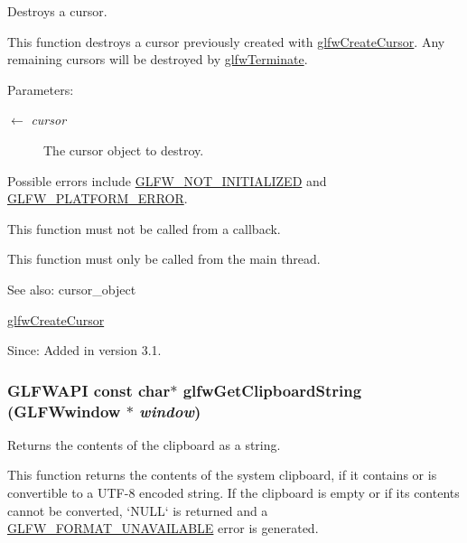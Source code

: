 Destroys a cursor. 

This function destroys a cursor previously created with \hyperlink{group__input_gc0f0f691f2d110f9acfb4bfe07f1216c}{glfwCreateCursor}. Any remaining cursors will be destroyed by \hyperlink{group__init_gfd90e6fd4819ea9e22e5e739519a6504}{glfwTerminate}.

\begin{Desc}
\item[Parameters:]
\begin{description}
\item[\mbox{$\leftarrow$} {\em cursor}]The cursor object to destroy.\end{description}
\end{Desc}
Possible errors include \hyperlink{group__errors_g2374ee02c177f12e1fa76ff3ed15e14a}{GLFW\_\-NOT\_\-INITIALIZED} and \hyperlink{group__errors_gd44162d78100ea5e87cdd38426b8c7a1}{GLFW\_\-PLATFORM\_\-ERROR}.

This function must not be called from a callback.

This function must only be called from the main thread.

\begin{Desc}
\item[See also:]cursor\_\-object 

\hyperlink{group__input_gc0f0f691f2d110f9acfb4bfe07f1216c}{glfwCreateCursor}\end{Desc}
\begin{Desc}
\item[Since:]Added in version 3.1. \end{Desc}
\hypertarget{group__input_g3ac90c8bbaf0b46063bb02b574f3b6f7}{
\subsubsection[glfwGetClipboardString]{\setlength{\rightskip}{0pt plus 5cm}GLFWAPI const char$\ast$ glfwGetClipboardString ({\bf GLFWwindow} $\ast$ {\em window})}}
\label{group__input_g3ac90c8bbaf0b46063bb02b574f3b6f7}


Returns the contents of the clipboard as a string. 

This function returns the contents of the system clipboard, if it contains or is convertible to a UTF-8 encoded string. If the clipboard is empty or if its contents cannot be converted, `NULL` is returned and a \hyperlink{group__errors_g196e125ef261d94184e2b55c05762f14}{GLFW\_\-FORMAT\_\-UNAVAILABLE} error is generated.

